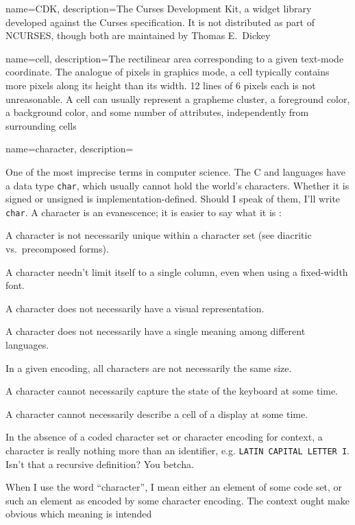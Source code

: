 {
  name={CDK},
description={The Curses Development Kit, a widget library developed against the
  Curses specification. It is not distributed as part of NCURSES, though
  both are maintained by Thomas E.\ Dickey}
}

{
  name={cell},
description={The rectilinear area corresponding to a given text-mode coordinate.
  The analogue of pixels in graphics mode, a cell typically contains more
  pixels along its height than its width. 12 lines of 6 pixels each is not
  unreasonable. A cell can usually represent a grapheme cluster, a foreground
  color, a background color, and some number of attributes, independently
  from surrounding cells}
}

{
  name={character},
description={One of the most imprecise terms in computer science. The C and \CC
  languages have a data type \texttt{char}, which usually cannot hold the
  world's characters. Whether it is signed or unsigned is implementation-defined.
  Should I speak of them, I'll write \texttt{char}. A character is an evanescence;
  it is easier to say what it is :
  \begin{denseitemize}
  \item{A character is not necessarily unique within a character set (see diacritic vs.\ precomposed forms).}
  \item{A character needn't limit itself to a single column, even when using a fixed-width font.}
  \item{A character does not necessarily have a visual representation.}
  \item{A character does not necessarily have a single meaning among different languages.}
  \item{In a given encoding, all characters are not necessarily the same size.}
  \item{A character cannot necessarily capture the state of the keyboard at some time.}
  \item{A character cannot necessarily describe a cell of a display at some time.}
  \end{denseitemize}

  In the absence of a coded character set or character encoding for context, a
  character is really nothing more than an identifier, e.g. \texttt{LATIN
    CAPITAL LETTER I}. Isn't that a recursive definition? You betcha.

  When I use the word ``character'', I mean either an element of some code set, or
  such an element as encoded by some character encoding. The context ought make
  obvious which meaning is intended}
}

